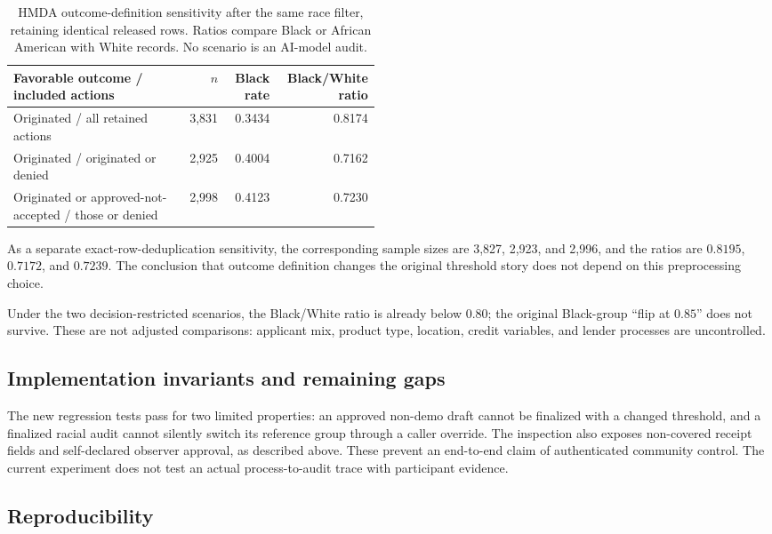\documentclass[10pt]{article}
\begin{document}
\begin{table}[ht]
\centering
\caption{HMDA outcome-definition sensitivity after the same race filter,
retaining identical released rows. Ratios compare Black or African American with White
records. No scenario is an AI-model audit.}
\label{tab:outcomes}
\begin{tabular}{p{0.48\linewidth}rrr}
\toprule
Favorable outcome / included actions & $n$ & Black rate & Black/White ratio \\
\midrule
Originated / all retained actions & 3,831 & 0.3434 & 0.8174 \\
Originated / originated or denied & 2,925 & 0.4004 & 0.7162 \\
Originated or approved-not-accepted / those or denied & 2,998 & 0.4123 & 0.7230 \\
\bottomrule
\end{tabular}
\end{table}

As a separate exact-row-deduplication sensitivity, the corresponding sample
sizes are 3,827, 2,923, and 2,996, and the ratios are $0.8195$, $0.7172$,
and $0.7239$. The conclusion that outcome definition changes the original
threshold story does not depend on this preprocessing choice.

Under the two decision-restricted scenarios, the Black/White ratio is already
below $0.80$; the original Black-group ``flip at $0.85$'' does not survive.
These are not adjusted comparisons: applicant mix, product type, location,
credit variables, and lender processes are uncontrolled.

\subsection{Implementation invariants and remaining gaps}

The new regression tests pass for two limited properties: an approved non-demo
draft cannot be finalized with a changed threshold, and a finalized racial
audit cannot silently switch its reference group through a caller override.
The inspection also exposes non-covered receipt fields and self-declared
observer approval, as described above. These prevent an end-to-end claim of
authenticated community control. The current experiment does not test an
actual process-to-audit trace with participant evidence.

\subsection{Reproducibility}
\end{document}

